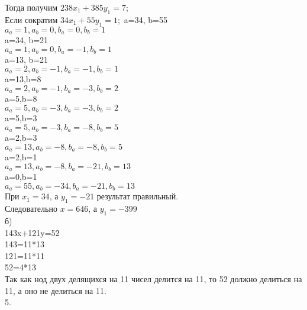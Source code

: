 \documentclass[a4paper,12pt]{article}
\begin{document}
Тогда получим $238x_1+385y_1=7;$\\
Если сократим $34x_1+55y_1=1;$
a=34, b=55\\
$a_a=1,a_b=0,b_a=0,b_b=1$\\
a=34, b=21\\
$a_a=1,a_b=0,b_a=-1,b_b=1$\\
a=13, b=21\\
$a_a=2,a_b=-1,b_a=-1,b_b=1$\\
a=13,b=8\\
$a_a=2,a_b=-1,b_a=-3,b_b=2$\\
a=5,b=8\\
$a_a=5,a_b=-3,b_a=-3,b_b=2$\\
a=5,b=3\\
$a_a=5,a_b=-3,b_a=-8,b_b=5$\\
a=2,b=3\\
$a_a=13,a_b=-8,b_a=-8,b_b=5$\\
a=2,b=1\\
$a_a=13,a_b=-8,b_a=-21,b_b=13$\\
a=0,b=1\\
$a_a=55,a_b=-34,b_a=-21,b_b=13$\\
При $x_1=34$, а $y_1=-21$ результат правильный.\\ Следовательно $x=646$, а $y_1=-399$\\
б)\\
143x+121y=52\\
143=11*13\\
121=11*11\\
52=4*13\\
Так как нод двух делящихся на 11 чисел делится на 11, то 
52 должно делиться на 11, а оно не делиться на 11. \\
5.\\
\end{document}
